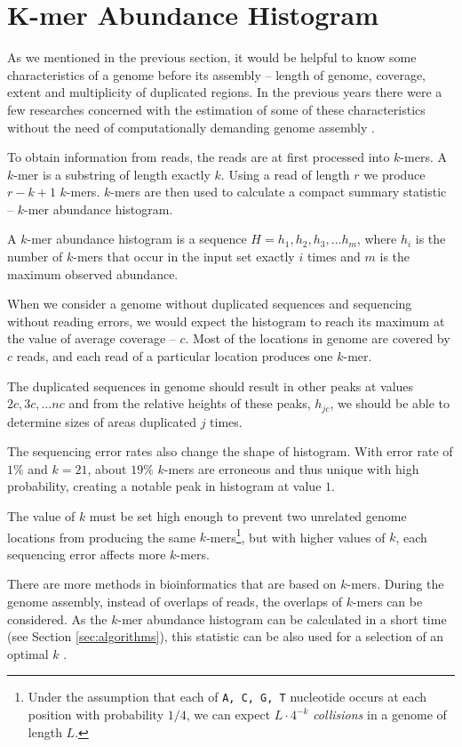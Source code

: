 \section{K-mer Abundance Histogram}
As we mentioned in the previous section, it would be helpful to know some characteristics of a genome before its assembly -- 
length of genome, coverage, extent and multiplicity of duplicated regions. In the previous years there were a few
researches concerned with the estimation of some of these characteristics without the need of computationally demanding 
genome assembly \cite{Hozza2015, Melsted2014, Sivadasan2016}. 

To obtain information from reads, the reads are at first processed into $k$-mers. A $k$-mer is a substring of length exactly $k$.
Using a read of length $r$ we produce $r-k+1$ $k$-mers. $k$-mers are then used to calculate a compact summary statistic -- $k$-mer 
abundance histogram. 

\begin{definition}
A $k$-mer abundance histogram is a sequence $H = h_1, h_2, h_3, \dots h_m$, where $h_i$ is the number of $k$-mers that occur in
the input set exactly $i$ times and $m$ is the maximum observed abundance.
\end{definition}

When we consider a genome without duplicated sequences and sequencing without reading errors, we would expect the histogram
to reach its maximum at the value of average coverage -- $c$. Most of the locations in genome are covered by $c$ reads,
and each read of a particular location produces one $k$-mer.

The duplicated sequences in genome should result in other peaks at values $2c, 3c, \dots nc$ and from the relative heights of these peaks, $h_{jc}$,
we should be able to determine sizes of areas duplicated $j$ times.

The sequencing error rates also change the shape of histogram. With error rate of $1\%$ and $k=21$, about $19\%$ $k$-mers are
erroneous and thus unique with high probability, creating a notable peak in histogram at value $1$. 

The value of $k$ must be set high enough to prevent two unrelated genome locations from producing the same $k$-mers\footnote{Under
the assumption that each of \texttt{A, C, G, T} nucleotide occurs at each position with probability $1/4$, we can expect
$L \cdot 4^{-k}$ \textit{collisions} in a genome of length $L$.}, but with higher values of $k$, each sequencing error affects more $k$-mers.

\medskip

There are more methods in bioinformatics that are based on $k$-mers. During the genome assembly, instead of overlaps of reads, the overlaps of $k$-mers can be
considered. As the $k$-mer abundance histogram can be calculated in a short time (see Section \ref{sec:algorithms}), this statistic can be also used for 
a selection of an optimal $k$ \cite{Chikhi2013}.

